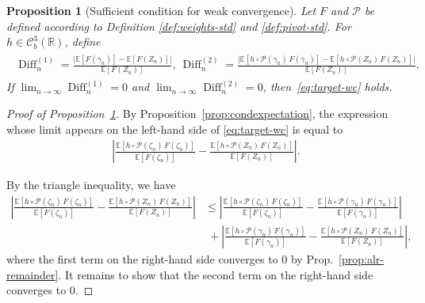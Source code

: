 \documentclass[12pt]{article}
\newcommand{\RD}{\operatorname{Diff}}
\newtheorem{proposition}{Proposition}[section]
\newcommand{\real}{\mathbb{R}}
\newcommand{\Ee}{{\mathbb{E}}}
\newcommand{\cP}{{\mathcal{P}}}
\begin{document}
\begin{appendices}
\begin{proposition}[Sufficient condition for weak convergence]
\label{prop:relative-diff}
Let $F$ and $\cP$ be defined according to Definition \ref{def:weights-std} and \ref{def:pivot-std}. 
For $h\in\mathcal C^3_b(\real)$, define
\begin{align*}
\begin{gathered}
  \RD_n^{(1)}
  =\frac{\big|\Ee[F(\gamma_n)]-\Ee[F(Z_n)]\big|}{\Ee[F(Z_n)]},\ \RD_n^{(2)}
  =\frac{\big|\Ee[h\circ\cP(\gamma_n)\,F(\gamma_n)]
           -\Ee[h\circ\cP(Z_n)\,F(Z_n)]\big|}{\Ee[F(Z_n)]}.
\end{gathered}
\end{align*}
If $\displaystyle\lim_{n  \to \infty} \RD_n^{(1)}=0$  and $\displaystyle\lim_{n  \to \infty} \RD_n^{(2)}=0$, then~\eqref{eq:target-wc} holds.
\end{proposition}

\begin{proof}[Proof of Proposition~\ref{prop:relative-diff}]
By Proposition~\ref{prop:condexpectation}, the expression whose limit appears on the left-hand side of \eqref{eq:target-wc} is equal to
\begin{align*}
  \left|
    \frac{\Ee[h\circ\cP(\zeta_n)\,F(\zeta_n)]}{\Ee[F(\zeta_n)]}
    -\frac{\Ee[h\circ\cP(Z_n)\,F(Z_n)]}{\Ee[F(Z_n)]}
  \right|.
\end{align*}

By the triangle inequality, we have
\begin{align*}
  \left|
    \frac{\Ee[h\circ\cP(\zeta_n)\,F(\zeta_n)]}{\Ee[F(\zeta_n)]}
    -\frac{\Ee[h\circ\cP(Z_n)\,F(Z_n)]}{\Ee[F(Z_n)]}
  \right|
  &\le
  \left|
    \frac{\Ee[h\circ\cP(\zeta_n)\,F(\zeta_n)]}{\Ee[F(\zeta_n)]}
    -\frac{\Ee[h\circ\cP(\gamma_n)\,F(\gamma_n)]}{\Ee[F(\gamma_n)]}
  \right|\\
  &\;+
  \left|
    \frac{\Ee[h\circ\cP(\gamma_n)\,F(\gamma_n)]}{\Ee[F(\gamma_n)]}
    -\frac{\Ee[h\circ\cP(Z_n)\,F(Z_n)]}{\Ee[F(Z_n)]}
  \right|,
\end{align*}
where the first term on the right-hand side converges to $0$ by Prop.~\ref{prop:alr-remainder}.
It remains to show that the second term on the right-hand side converges to $0$.


\end{proof}
\end{appendices}
\end{document}
